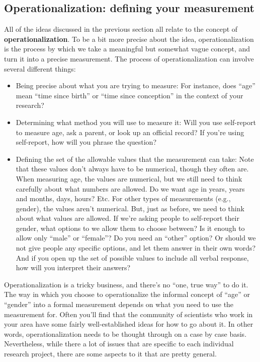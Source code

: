 \documentclass[]{book}
\begin{document}
\hypertarget{operationalization-defining-your-measurement}{%
\subsection{Operationalization: defining your measurement}\label{operationalization-defining-your-measurement}}

All of the ideas discussed in the previous section all relate to the concept of \textbf{operationalization}. To be a bit more precise about the idea, operationalization is the process by which we take a meaningful but somewhat vague concept, and turn it into a precise measurement. The process of operationalization can involve several different things:

\begin{itemize}
\item
  Being precise about what you are trying to measure: For instance, does ``age'' mean ``time since birth'' or ``time since conception'' in the context of your research?
\item
  Determining what method you will use to measure it: Will you use self-report to measure age, ask a parent, or look up an official record? If you're using self-report, how will you phrase the question?
\item
  Defining the set of the allowable values that the measurement can take: Note that these values don't always have to be numerical, though they often are. When measuring age, the values are numerical, but we still need to think carefully about what numbers are allowed. Do we want age in years, years and months, days, hours? Etc. For other types of measurements (e.g., gender), the values aren't numerical. But, just as before, we need to think about what values are allowed. If we're asking people to self-report their gender, what options to we allow them to choose between? Is it enough to allow only ``male'' or ``female''? Do you need an ``other'' option? Or should we not give people any specific options, and let them answer in their own words? And if you open up the set of possible values to include all verbal response, how will you interpret their answers?
\end{itemize}

Operationalization is a tricky business, and there's no ``one, true way'' to do it. The way in which you choose to operationalize the informal concept of ``age'' or ``gender'' into a formal measurement depends on what you need to use the measurement for. Often you'll find that the community of scientists who work in your area have some fairly well-established ideas for how to go about it. In other words, operationalization needs to be thought through on a case by case basis. Nevertheless, while there a lot of issues that are specific to each individual research project, there are some aspects to it that are pretty general.
\end{document}
